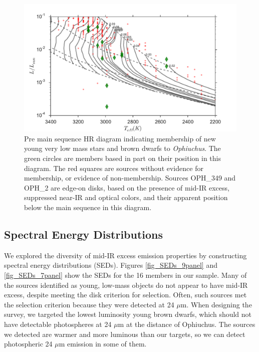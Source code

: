 \begin{landscape}
	
\end{landscape}

\begin{figure}[ht!]
  \caption{Pre main sequence HR diagram indicating membership of new young very low mass stars and brown dwarfs to \emph{Ophiuchus}.  The green circles are members based in part on their position in this diagram.  The red squares are sources without evidence for membership, or evidence of non-membership.  Sources OPH\_349 and OPH\_2 are edge-on disks, based on the presence of mid-IR excess, suppressed near-IR and optical colors, and their apparent position below the main sequence in this diagram. \label{fig_HRD_NaI_Ex} }
\centering
\includegraphics[scale=0.6]{chIMACS/figures/HRD_zoom.pdf}
\end{figure}

\subsection{Spectral Energy Distributions}
\label{sec_SED}

We explored the diversity of mid-IR excess emission properties by constructing spectral energy distributions (SEDs).  Figures \ref{fig_SEDs_9panel} and \ref{fig_SEDs_7panel} show the SEDs for the 16 members in our sample.  Many of the sources identified as young, low-mass objects do not appear to have mid-IR excess, despite meeting the disk criterion for selection.  Often, such sources met the selection criterion because they were detected at 24 $\mu$m.  When designing the survey, we targeted the lowest luminosity young brown dwarfs, which should not have detectable photospheres at 24 $\mu$m at the distance of Ophiuchus.  The sources we detected are warmer and more luminous than our targets, so we can detect photospheric 24 $\mu$m emission in some of them.


